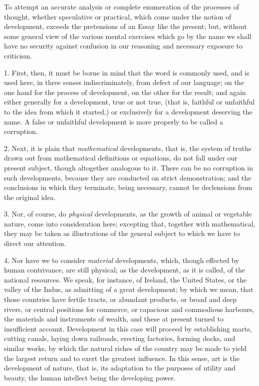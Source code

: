 
To attempt an accurate analysis or complete
enumeration of the processes of thought, whether
speculative or practical, which come under the notion of
development, exceeds the pretensions of an Essay like the
present; but, without some general view of the various
mental exercises which go by the name we shall have no
security against confusion in our reasoning and necessary
exposure to criticism.

1. First, then, it must be borne in mind that the word
is commonly used, and is used here, in three senses
indiscriminately, from defect of our language; on the one
hand for the process of development, on the other for the
result; and again either generally for a development,
true or not true, (that is, faithful or unfaithful to the
idea from which it started,) or exclusively for a
development deserving the name. A false or unfaithful
development is more properly to be called a corruption.

2. Next, it is plain that \emph{mathematical}
developments, that is, the system of truths drawn out
from mathematical definitions or equations, do not fall
under our present subject, though altogether analogous to
it. There can be no corruption in such developments,
because they are conducted on strict demonstration; and
the conclusions in which they terminate, being necessary,
cannot be declensions from the original idea.

3. Nor, of course, do \emph{physical} developments, as
the growth of animal or vegetable nature, come into
consideration here; excepting that, together with
mathematical, they may be taken as illustrations of the
general subject to which we have to direct our attention.

4. Nor have we to consider \emph{material}
developments, which, though effected by human
contrivance, are still physical; as the development, as
it is called, of the national resources. We speak, for
instance, of Ireland, the United States, or the valley of
the Indus, as admitting of a great development; by which
we mean, that those countries have fertile tracts, or
abundant products, or broad and deep rivers, or central
positions for commerce, or capacious and commodious
harbours, the materials and instruments of wealth, and
these at present turned to insufficient account.
Development in this case will proceed by establishing
marts, cutting canals, laying down railroads, erecting
factories, forming docks, and similar works, by which the
natural riches of the country may be made to yield the
largest return and to exert the greatest influence. In
this sense, art is the development of nature, that is,
its adaptation to the purposes of utility and beauty, the
human intellect being the developing power.

